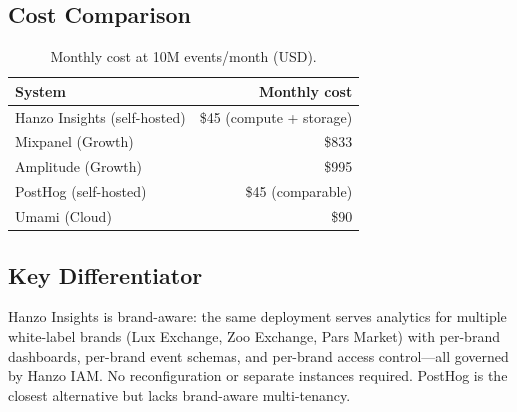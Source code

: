 \subsection{Cost Comparison}

\begin{table}[H]
\centering
\caption{Monthly cost at 10M events/month (USD).}
\footnotesize
\begin{tabular}{@{}lr@{}}
\toprule
System & Monthly cost \\
\midrule
Hanzo Insights (self-hosted) & \$45 (compute + storage) \\
Mixpanel (Growth) & \$833 \\
Amplitude (Growth) & \$995 \\
PostHog (self-hosted) & \$45 (comparable) \\
Umami (Cloud) & \$90 \\
\bottomrule
\end{tabular}
\end{table}

\subsection{Key Differentiator}

Hanzo Insights is brand-aware: the same deployment serves analytics for multiple white-label brands (Lux Exchange, Zoo Exchange, Pars Market) with per-brand dashboards, per-brand event schemas, and per-brand access control---all governed by Hanzo IAM. No reconfiguration or separate instances required. PostHog is the closest alternative but lacks brand-aware multi-tenancy.

